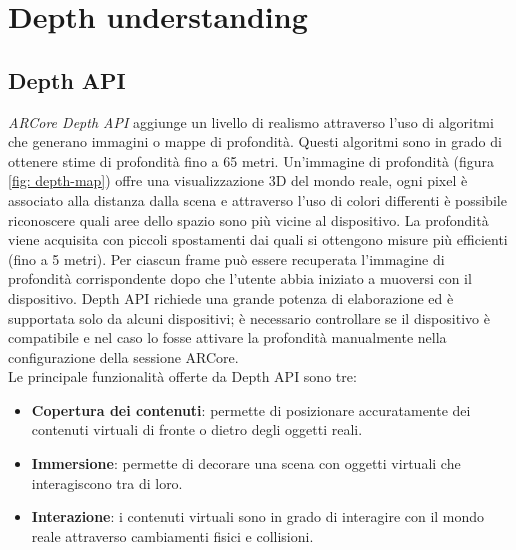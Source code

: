 \documentclass[crop=false, class=book]{standalone}
\begin{document}
		
	\chapter{Depth understanding}
	
		\section{Depth API}
	
			\textit{ARCore Depth API} aggiunge un livello di realismo attraverso l'uso di algoritmi che generano immagini o mappe di profondità. Questi algoritmi sono in grado di ottenere stime di profondità fino a 65 metri. Un'immagine di profondità (figura \vref{fig: depth-map}) offre una visualizzazione 3D del mondo reale, ogni pixel è associato alla distanza dalla scena e attraverso l'uso di colori differenti è possibile riconoscere quali aree dello spazio sono più vicine al dispositivo. La profondità viene acquisita con piccoli spostamenti dai quali si ottengono misure più efficienti (fino a 5 metri). Per ciascun frame può essere recuperata l'immagine di profondità corrispondente dopo che l'utente abbia iniziato a muoversi con il dispositivo. Depth API richiede una grande potenza di elaborazione ed è supportata solo da alcuni dispositivi; è necessario controllare se il dispositivo è compatibile e nel caso lo fosse attivare la profondità manualmente nella configurazione della sessione ARCore.\\
		 	Le principale funzionalità offerte da Depth API sono tre:
		\begin{itemize}
			\item \textbf{Copertura dei contenuti}: permette di posizionare accuratamente dei contenuti virtuali di fronte o dietro degli oggetti reali.
			\item \textbf{Immersione}: permette di decorare una scena con oggetti virtuali che interagiscono tra di loro.
			\item \textbf{Interazione}: i contenuti virtuali sono in grado di interagire con il mondo reale attraverso cambiamenti fisici e collisioni.
		\end{itemize}
		
\end{document}
